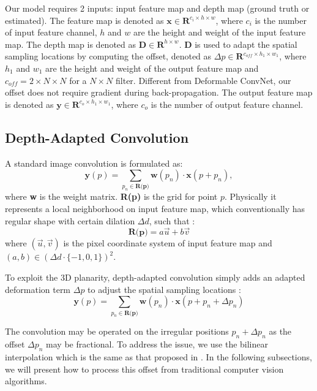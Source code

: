 \documentclass[lettersize,journal]{IEEEtran}
\begin{document}
Our model requires 2 inputs: input feature map and depth map (ground truth or estimated). The feature map is denoted as $\textbf{x} \in \mathbf{R}^{c_{i}\times h\times w}$, where $c_i$ is the number of input feature channel, $h$ and $w$ are the height and weight of the input feature map. The depth map is denoted as $\textbf{D} \in \mathbf{R}^{h\times w}$. $\textbf{D}$ is used to adapt the spatial sampling locations by computing the offset, denoted as $\Delta p \in \mathbf{R}^{c_{off}\times h_1\times w_1}$, where $h_1$ and $w_1$ are the height and weight of the output feature map and $c_{off} = 2\times N \times N$ for a $N\times N$ filter. Different from Deformable ConvNet, our offset does not require gradient during back-propagation. The output feature map is denoted as $\textbf{y} \in \mathbf{R}^{c_{o}\times h_1\times w_1}$, where $c_{o}$ is the number of output feature channel.



\subsection{Depth-Adapted Convolution}

A standard image convolution is formulated as: 
\begin{equation}
   \textbf{y}(p) = \sum_{p_n\in\textbf{R(p)}} \textbf{w}(p_n)  \cdot \textbf{x}(p + p_n),
\end{equation}
where \textbf{w} is the weight matrix. \textbf{R(p)} is the grid for point $p$. Physically it represents a local neighborhood on input feature map, which conventionally has regular shape with certain dilation $\Delta d$, such that : 
\begin{equation}
    \textbf{R(p)} = a \Vec{u} + b\Vec{v}
    \label{eq:2dgrid}
\end{equation}
where $(\Vec{u}, \Vec{v})$ is the pixel coordinate system of input feature map and $(a,b) \in (\Delta d \cdot \{-1, 0 , 1\})^2$.


To exploit the 3D planarity, depth-adapted convolution simply adds an adapted deformation term $\Delta p$ to adjust the spatial sampling locations : 
\begin{equation}
   \textbf{y}(p) = \sum_{p_n\in\textbf{R(p)}} \textbf{w}(p_n)  \cdot \textbf{x}(p + p_n + \Delta p_n)
   \label{eq}
\end{equation}

The convolution may be operated on the irregular positions $p_n+\Delta p_n$ as the offset $\Delta p_n$ may be fractional. To address the issue, we use the bilinear interpolation which is the same as that proposed in \cite{dai2017deformable}. In the following subsections, we will present how to process this offset from traditional computer vision algorithms.
\end{document}
